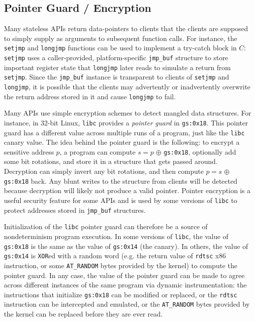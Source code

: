 \subsection{Pointer Guard / Encryption}
Many stateless APIs return data-pointers to clients 
that the clients are supposed to simply supply as arguments
to subsequent function calls. 
For instance, the \texttt{setjmp} and \texttt{longjmp} functions
can be used to implement a try-catch block in $C$: \texttt{setjmp} uses 
a caller-provided, platform-specific \texttt{jmp\_buf} structure
to store important register state that \texttt{longjmp} later reads to simulate a return from \texttt{setjmp}.
Since the \texttt{jmp\_buf} instance is transparent to clients of \texttt{setjmp}
and \texttt{longjmp}, it is possible that the clients may advertently or inadvertently
overwrite the return address stored in it and cause
\texttt{longjmp} to fail.

Many APIs use simple encryption schemes to detect mangled data structures.
For instance, in 32-bit Linux, \texttt{libc} provides
a {\em pointer guard}  in \texttt{gs:0x18}. This pointer guard has a different value
across multiple runs of a program, just like the \texttt{libc} canary value.
The idea behind the pointer guard is the following: to encrypt a sensitive address $p$, a program
can compute $s = p$  $\oplus  $ \texttt{gs:0x18}, optionally add some bit rotations, and store it in a structure
that gets passed around. Decryption can simply invert any bit rotations, 
and then compute $p = s$ $\oplus  $ \texttt{gs:0x18} back. Any blunt writes to the structure from clients will be detected because 
decryption will likely not produce a valid pointer. 
Pointer encryption is a useful security feature for some APIs
and is used by some versions of \texttt{libc} to protect addresses stored in \texttt{jmp\_buf}
structures.

Initialization of the \texttt{libc} pointer guard can therefore be a source of nondeterminism
program execution. In some versions of \texttt{libc}, the value of \texttt{gs:0x18} is the same
as the value of \texttt{gs:0x14} (the canary). In others,
the value of \texttt{gs:0x14} is \texttt{XOR}ed with 
a random word (e.g. the return value of \texttt{rdtsc} x86 instruction,
or some \texttt{AT\_RANDOM} bytes provided by the kernel) to compute
the pointer guard. In any case, the value of the pointer
guard can be made to agree across different instances
of the same program via dynamic instrumentation: 
the instructions that initialize \texttt{gs:0x18} can
be modified or replaced, or the \texttt{rdtsc} instruction
can be intercepted and emulated, or the  \texttt{AT\_RANDOM} bytes provided by the kernel can be
replaced before they are ever read.

